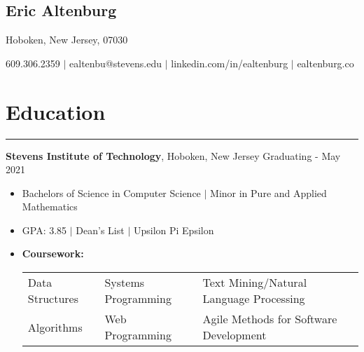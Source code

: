 \documentclass[10pt]{article}
\newcommand{\name}[1]{\begin{center}\section*{\huge #1}\end{center}}
\newcommand{\topinfo}[1]{\begin{center}\vspace{-0.15cm}#1\vspace{-0.15cm}\end{center}}
\newcommand{\resumesection}[1]{\vspace{-0.2cm}\section*{#1}\vspace{-0.2cm}\hrule\vspace{0.2cm}}
\begin{document}
\name{Eric Altenburg}
\topinfo{Hoboken, New Jersey, 07030}

\topinfo{609.306.2359 $\vert$ ealtenbu@stevens.edu $\vert$ linkedin.com/in/ealtenburg $\vert$ ealtenburg.co}








\resumesection{Education}
\textbf{Stevens Institute of Technology}, Hoboken, New Jersey \hfill Graduating - May 2021
\begin{itemize}
	\item[] Bachelors of Science in Computer Science $\vert$ Minor in Pure and Applied Mathematics
	\item[] GPA: 3.85 $\vert$ Dean's List $\vert$ Upsilon Pi Epsilon 
	\item[] \textbf{Coursework:}
	\setlength\tabcolsep{8 pt}
			\begin{tabular}[t]{llll}
				Data Structures & Systems Programming & Text Mining/Natural Language Processing\\ %
				Algorithms & Web Programming & Agile Methods for Software Development
			\end{tabular}

\end{itemize}
\end{document}
